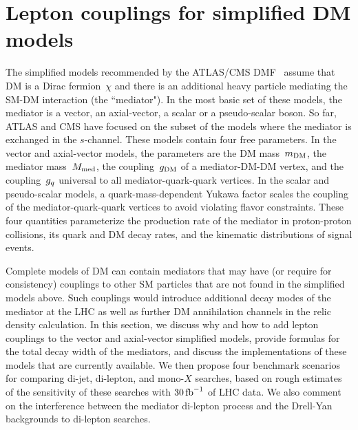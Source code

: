 \section{Lepton couplings for simplified %
DM models}
\label{sec:models}




The simplified models recommended by the ATLAS/CMS DMF~\cite{Abercrombie:2015wmb} assume that DM is a Dirac fermion~$\chi$ and there is an additional heavy particle mediating the SM-DM interaction (the ``mediator"). In the most basic set of these models, the mediator is a vector, an axial-vector, a scalar or a pseudo-scalar boson. So far, ATLAS and CMS have focused on the subset of the models where the mediator is exchanged in the $s$-channel. These models contain four free parameters. In the vector and axial-vector models, the parameters are the DM mass~$m_{\rm{DM}}$, the mediator mass~$M_{\rm{med}}$, the coupling~$g_{\rm{DM}}$ of a mediator-DM-DM vertex, and the coupling~$g_q$ universal to all mediator-quark-quark vertices. In the scalar and pseudo-scalar models, a quark-mass-dependent Yukawa factor scales the coupling of the mediator-quark-quark vertices to avoid violating flavor constraints. These four quantities parameterize the production rate of the mediator in proton-proton collisions, its quark and DM decay rates, and the kinematic distributions of signal events.

Complete models of DM can contain mediators that may have (or require for consistency) couplings to other SM particles that are not found in the simplified models above. Such couplings would introduce additional decay modes of the mediator at the LHC as well as further DM annihilation channels in the relic density calculation. In this section, we discuss why and how to add lepton couplings to the vector and axial-vector simplified models, provide formulas for the total decay width of the mediators, and discuss the implementations of these models that are currently available. We then propose four benchmark scenarios for comparing di-jet, di-lepton, and mono-$X$ searches, based on rough estimates of the sensitivity of these searches with $30 \, {\rm fb}^{-1}$ of LHC data. We also comment on the interference between the mediator di-lepton process and the Drell-Yan backgrounds to di-lepton searches. 

